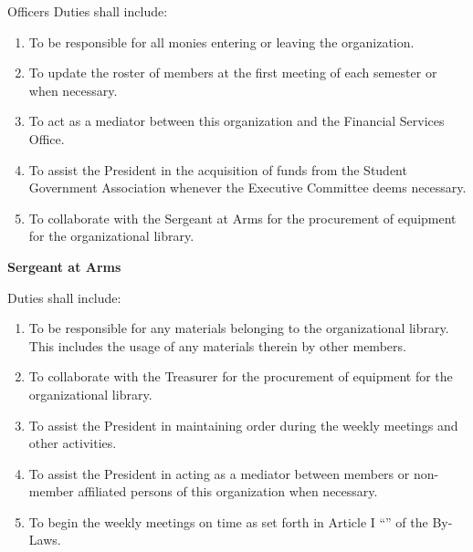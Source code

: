 {\begin{article}{Officers}
		Duties shall include:
		\begin{enumerate}
			\item To be responsible for all monies entering or leaving the organization.
			\item To update the roster of members at the first meeting of each semester or when necessary.
			\item To act as a mediator between this organization and the Financial Services Office.
			\item To assist the President in the acquisition of funds from the Student Government Association whenever the Executive Committee deems necessary.
			\item To collaborate with the Sergeant at Arms for the procurement of equipment for the organizational library.
		\end{enumerate}
		\item \textbf{Sergeant at Arms}
		
		Duties shall include:
		\begin{enumerate}
			\item To be responsible for any materials belonging to the organizational library. This includes the usage of any materials therein by other members.
			\item To collaborate with the Treasurer for the procurement of equipment for the organizational library.
			\item To assist the President in maintaining order during the weekly meetings and other activities.
			\item To assist the President in acting as a mediator between members or non-member affiliated persons of this organization when necessary.
			\item To begin the weekly meetings on time as set forth in Article I \enquote{} of the By-Laws.
		\end{enumerate}
	\end{article}
}